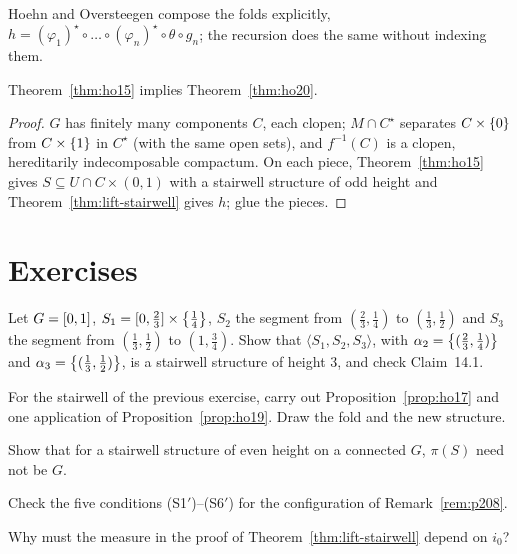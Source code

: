
Hoehn and Oversteegen compose the folds explicitly, $h=(\varphi_1)^\star\circ\dots\circ(\varphi_n)^\star\circ\theta\circ g_n$; the recursion does the same without indexing them.

\begin{theorem}\label{thm:20-from-15}
Theorem~\ref{thm:ho15} implies Theorem~\ref{thm:ho20}.
\end{theorem}

\begin{proof}
$G$ has finitely many components $C$, each clopen; $M\cap C^\star$ separates $C\times\left\{ 0 \right\}$ from $C\times\left\{ 1 \right\}$ in $C^\star$ (with the same open sets), and $f^{-1}(C)$ is a clopen, hereditarily
indecomposable compactum. On each piece, Theorem~\ref{thm:ho15} gives $S\subseteq U\cap C\times(0,1)$ with a stairwell structure of odd height and Theorem~\ref{thm:lift-stairwell} gives $h$; glue
the pieces.
\end{proof}


\section*{Exercises}

\begin{exercise}
Let $G=[0,1]$, $S_1=[0,\frac23]\times\left\{ \frac14 \right\}$, $S_2$ the segment from $(\frac23,\frac14)$ to $(\frac13,\frac12)$ and $S_3$ the segment from $(\frac13,\frac12)$ to $(1,\frac34)$.
Show that $\langle S_1,S_2,S_3\rangle$, with $\alpha_2=\left\{ (\frac23,\frac14) \right\}$ and $\alpha_3=\left\{ (\frac13,\frac12) \right\}$, is a stairwell structure of height $3$, and check Claim~14.1.
\end{exercise}

\begin{exercise}
For the stairwell of the previous exercise, carry out Proposition~\ref{prop:ho17} and one application of Proposition~\ref{prop:ho19}. Draw the fold and the new structure.
\end{exercise}

\begin{exercise}
Show that for a stairwell structure of even height on a connected $G$, $\pi(S)$ need not be $G$.
\end{exercise}

\begin{exercise}
Check the five conditions (S1$'$)--(S6$'$) for the configuration of Remark~\ref{rem:p208}.
\end{exercise}

\begin{exercise}
Why must the measure in the proof of Theorem~\ref{thm:lift-stairwell} depend on $i_0$?
\end{exercise}
